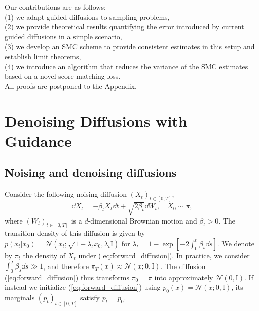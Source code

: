 \documentclass{article}
\theoremstyle{plain}
\theoremstyle{definition}
\theoremstyle{remark}
\begin{document}
Our contributions are as follows:\\
(1) we adapt guided diffusions to sampling problems, \\
(2) we provide theoretical results quantifying the error introduced by current guided diffusions in a simple scenario,\\ (3) we develop an SMC scheme to provide consistent estimates in this setup and establish limit theorems,\\ (4) we introduce an algorithm that reduces the variance of the SMC estimates based on a novel score matching loss. \\
All proofs are postponed to the Appendix.







\section{Denoising Diffusions with Guidance} \label{sec:conditioned_diffusion}
\subsection{Noising and denoising diffusions}
\label{sec:diffusion_basic}
Consider the following noising diffusion $(X_t)_{t\in[0,T]}$,
\begin{equation}
	\label{eq:forward_diffusion}
	\dd X_t = -\beta_t X_t \dd t + \sqrt{2\beta_t} \dd W_t,\quad X_0 \sim \pi ,
\end{equation}
where $(W_t)_{t\in[0,T]}$ is a $d$-dimensional Brownian motion and $\beta_t>0$. %
The transition density of this diffusion is given by $p(x_t|x_0)=\mathcal{N}(x_t;\sqrt{1-\lambda_t}x_0,\lambda_t \mathrm{I})$ for $\textstyle \lambda_t=1- \exp[-2 \int_0^t \beta_s\dd s]$. We denote by $\pi_t$ the density of $X_t$ under (\ref{eq:forward_diffusion}). In practice, we consider $ \int_0^T \beta_s \dd s \gg 1$, and therefore $\pi_T(x) \approx \mathcal{N}(x;0,\mathrm{I})$. The diffusion (\ref{eq:forward_diffusion}) thus transforms $\pi_0=\pi$ into approximately $\mathcal{N}(0,\mathrm{I})$. If instead we initialize (\ref{eq:forward_diffusion}) using $p_0(x)= \mathcal{N}(x;0,\mathrm{I})$, its marginals $(p_t)_{t\in[0,T]}$ satisfy $p_t=p_0$.
\end{document}
